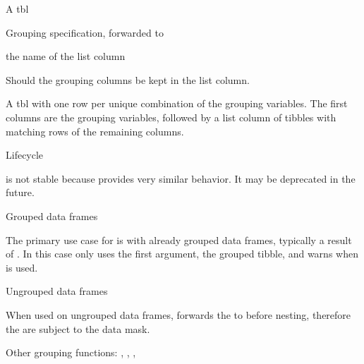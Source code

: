 \documentclass[a4paper]{book}
\begin{document}
%
\begin{Arguments}
\begin{ldescription}
\item[\code{.tbl}] A tbl

\item[\code{...}] Grouping specification, forwarded to 

\item[\code{.key}] the name of the list column

\item[\code{keep}] Should the grouping columns be kept in the list column.
\end{ldescription}
\end{Arguments}
%
\begin{Value}
A tbl with one row per unique combination of the grouping variables.
The first columns are the grouping variables, followed by a list column of tibbles
with matching rows of the remaining columns.
\end{Value}
%
\begin{Section}{Lifecycle}

 is not stable because 
provides very similar behavior. It may be deprecated in the future.
\end{Section}
%
\begin{Section}{Grouped data frames}


The primary use case for  is with already grouped data frames,
typically a result of . In this case  only uses
the first argument, the grouped tibble, and warns when  is used.
\end{Section}
%
\begin{Section}{Ungrouped data frames}


When used on ungrouped data frames,  forwards the  to
 before nesting, therefore the  are subject to the data mask.
\end{Section}
%
\begin{SeeAlso}
Other grouping functions: 
,
,
,
\end{SeeAlso}
\end{document}
